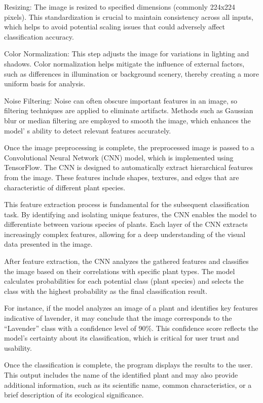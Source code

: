 \begin{multicols}{2}
Resizing: The image is resized to specified dimensions (commonly 224x224
pixels). This standardization is crucial to maintain consistency across
all inputs, which helps to avoid potential scaling issues that could
adversely affect classification accuracy.

Color Normalization: This step adjusts the image for variations in
lighting and shadows. Color normalization helps mitigate the influence
of external factors, such as differences in illumination or background
scenery, thereby creating a more uniform basis for analysis.

Noise Filtering: Noise can often obscure important features in an image,
so filtering techniques are applied to eliminate artifacts. Methods such
as Gaussian blur or median filtering are employed to smooth the image,
which enhances the model' s ability to detect relevant
features accurately.

Once the image preprocessing is complete, the preprocessed image is
passed to a Convolutional Neural Network (CNN) model, which is
implemented using TensorFlow. The CNN is designed to automatically
extract hierarchical features from the image. These features include
shapes, textures, and edges that are characteristic of different plant
species.

This feature extraction process is fundamental for the subsequent
classification task. By identifying and isolating unique features, the
CNN enables the model to differentiate between various species of
plants. Each layer of the CNN extracts increasingly complex features,
allowing for a deep understanding of the visual data presented in the
image.

After feature extraction, the CNN analyzes the gathered features and
classifies the image based on their correlations with specific plant
types. The model calculates probabilities for each potential class
(plant species) and selects the class with the highest probability as
the final classification result.

For instance, if the model analyzes an image of a plant and identifies
key features indicative of lavender, it may conclude that the image
corresponds to the ``Lavender'' class with a confidence level of 90\%.
This confidence score reflects the model's certainty about its
classification, which is critical for user trust and usability.

Once the classification is complete, the program displays the results to
the user. This output includes the name of the identified plant and may
also provide additional information, such as its scientific name, common
characteristics, or a brief description of its ecological significance.


\end{multicols}
